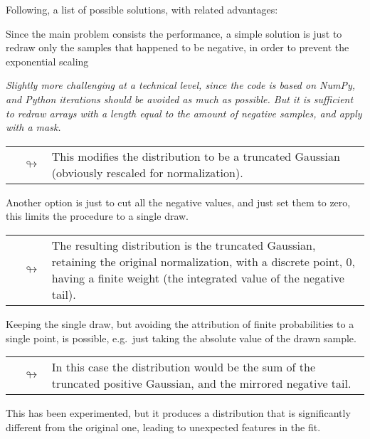 Following, a list of possible solutions, with related advantages:
\begin{description}[font=\normalfont\sffamily\scshape,leftmargin=2cm,style=nextline]
  \item[decouple] Since the main problem consists the performance, a simple
    solution is just to redraw only the samples that happened to be negative,
    in order to prevent the exponential scaling

    {\small\itshape\noindent
      Slightly more challenging at a technical level, since the code is based
      on NumPy, and Python iterations should be avoided as much as possible.
      But it is sufficient to redraw arrays with a length equal to the amount
      of negative samples, and apply with a mask.
    }

    \begin{tabularx}{\linewidth}{cX}
      $\quad\looparrowright$ & This modifies the distribution to be a truncated
      Gaussian (obviously rescaled for normalization).
    \end{tabularx}

  \item[wall] Another option is just to cut all the negative values, and just
    set them to zero, this limits the procedure to a single draw.

    \begin{tabularx}{\linewidth}{cX}
      $\quad\looparrowright$ & The resulting distribution is the truncated
      Gaussian, retaining the original normalization, with a discrete point,
      $0$, having a finite weight (the integrated value of the negative tail).
    \end{tabularx}

  \item[reflection] Keeping the single draw, but avoiding the attribution of
    finite probabilities to a single point, is possible, e.g.\ just taking the
    absolute value of the drawn sample.

    \begin{tabularx}{\linewidth}{cX}
      $\quad\looparrowright$ & In this case the distribution would be the sum
      of the truncated positive Gaussian, and the mirrored negative tail.
    \end{tabularx}

    This has been experimented, but it produces a distribution that is
    significantly different from the original one, leading to unexpected
    features in the fit.


\end{description}
